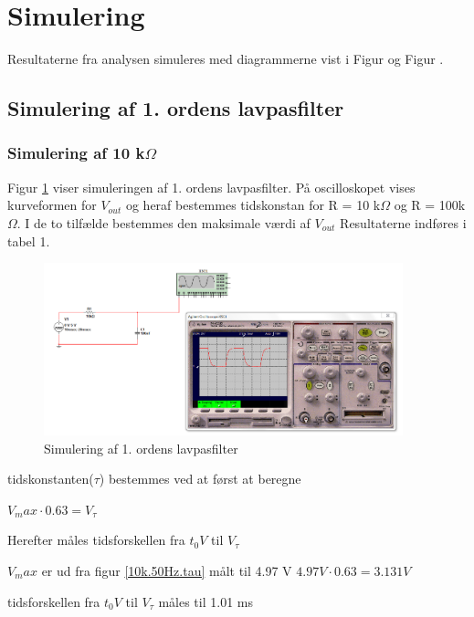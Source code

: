 
\section{Simulering}
Resultaterne fra analysen simuleres med diagrammerne vist i Figur  og Figur . 

\subsection{Simulering af 1. ordens lavpasfilter}

\subsubsection{Simulering af 10 k$\Omega$ }
Figur \ref{1.orden} viser simuleringen af 1. ordens lavpasfilter. På oscilloskopet vises kurveformen for $V_{out}$ og heraf bestemmes tidskonstan for R = 10 k$\Omega$ og R = 100k$\Omega$.
I de to tilfælde bestemmes den maksimale værdi af $V_{out}$
Resultaterne indføres i tabel 1.

\begin{figure}[h]
 \begin{center}
  \includegraphics[height=5cm]{P_Fig/figur1}
  \caption{Simulering af 1. ordens lavpasfilter}
  \label{1.orden}
 \end{center}
\end{figure}

tidskonstanten($\tau$) bestemmes ved at først at beregne 

$V_max \cdot 0.63 = V_{\tau}$

Herefter måles tidsforskellen fra $t_0 V$ til $V_{\tau}$

$V_max$ er ud fra figur \ref{10k.50Hz.tau} målt til 4.97 V
$4.97 V \cdot 0.63 = 3.131 V$

tidsforskellen fra $t_0 V$ til $V_{\tau}$ måles til 1.01 ms

